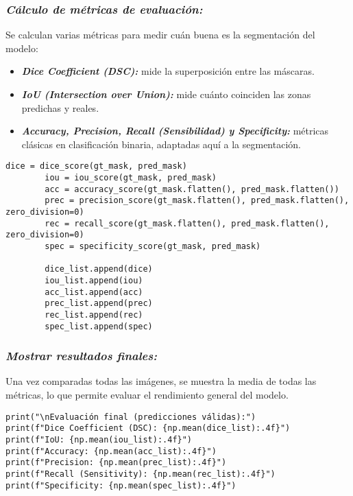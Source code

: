 \documentclass[12pt]{article}
\begin{document}
\subsubsection{\textit{Cálculo de métricas de evaluación:}}
Se calculan varias métricas para medir cuán buena es la segmentación del modelo:
\begin{itemize}
    \item \textit\textbf \textbf{Dice Coefficient (DSC):} mide la superposición entre las máscaras.
    \item \textit \textbf \textbf{IoU (Intersection over Union):} mide cuánto coinciden las zonas predichas y reales.
    \item \textit \textbf \textbf{Accuracy, Precision, Recall (Sensibilidad) y Specificity:} métricas clásicas en clasificación binaria, adaptadas aquí a la segmentación.
\end{itemize}
\begin{lstlisting}[caption={Cálculo de métricas de segmentación}, label=lst:metrics_calc]
        dice = dice_score(gt_mask, pred_mask)
        iou = iou_score(gt_mask, pred_mask)
        acc = accuracy_score(gt_mask.flatten(), pred_mask.flatten())
        prec = precision_score(gt_mask.flatten(), pred_mask.flatten(), zero_division=0)
        rec = recall_score(gt_mask.flatten(), pred_mask.flatten(), zero_division=0)
        spec = specificity_score(gt_mask, pred_mask)

        dice_list.append(dice)
        iou_list.append(iou)
        acc_list.append(acc)
        prec_list.append(prec)
        rec_list.append(rec)
        spec_list.append(spec)
\end{lstlisting}
\subsubsection{\textit{Mostrar resultados finales:}}
Una vez comparadas todas las imágenes, se muestra la media de todas las métricas, lo que permite evaluar el rendimiento general del modelo.
\begin{lstlisting}[caption={Mostrar métricas medias finales}, label=lst:metrics_result]
print("\nEvaluación final (predicciones válidas):")
print(f"Dice Coefficient (DSC): {np.mean(dice_list):.4f}")
print(f"IoU: {np.mean(iou_list):.4f}")
print(f"Accuracy: {np.mean(acc_list):.4f}")
print(f"Precision: {np.mean(prec_list):.4f}")
print(f"Recall (Sensitivity): {np.mean(rec_list):.4f}")
print(f"Specificity: {np.mean(spec_list):.4f}")
\end{lstlisting}
\end{document}
